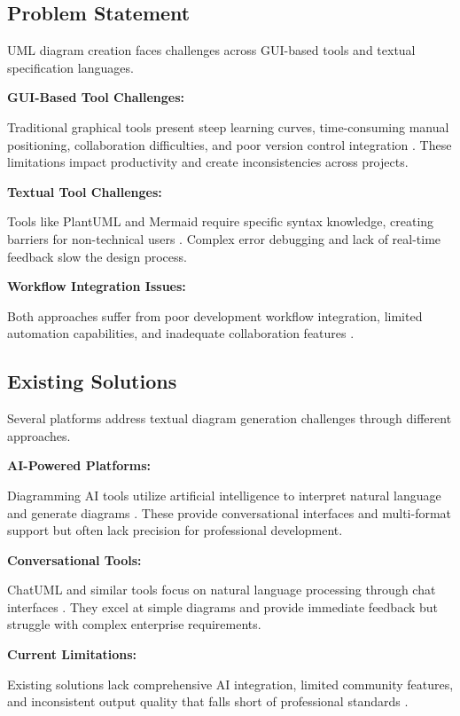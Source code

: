 \subsection{Problem Statement}

UML diagram creation faces challenges across GUI-based tools and textual specification languages.

\textbf{GUI-Based Tool Challenges:}

Traditional graphical tools present steep learning curves, time-consuming manual positioning, collaboration difficulties, and poor version control integration \cite{gui_limitations}. These limitations impact productivity and create inconsistencies across projects.

\textbf{Textual Tool Challenges:}

Tools like PlantUML and Mermaid require specific syntax knowledge, creating barriers for non-technical users \cite{plantuml_guide}. Complex error debugging and lack of real-time feedback slow the design process.

\textbf{Workflow Integration Issues:}

Both approaches suffer from poor development workflow integration, limited automation capabilities, and inadequate collaboration features \cite{workflow_integration}.

\subsection{Existing Solutions}

Several platforms address textual diagram generation challenges through different approaches.

\textbf{AI-Powered Platforms:}

Diagramming AI tools utilize artificial intelligence to interpret natural language and generate diagrams \cite{diagramming_ai}. These provide conversational interfaces and multi-format support but often lack precision for professional development.

\textbf{Conversational Tools:}

ChatUML and similar tools focus on natural language processing through chat interfaces \cite{chatuml}. They excel at simple diagrams and provide immediate feedback but struggle with complex enterprise requirements.

\textbf{Current Limitations:}

Existing solutions lack comprehensive AI integration, limited community features, and inconsistent output quality that falls short of professional standards \cite{existing_tools_analysis}.

